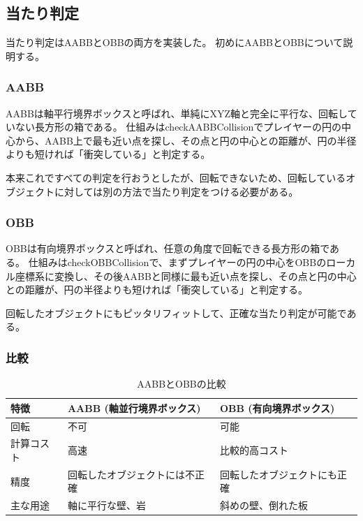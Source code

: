 \documentclass[uplatex,dvipdfmx,a4paper]{jsarticle}
\begin{document}
\subsection{当たり判定}
当たり判定はAABBとOBBの両方を実装した。
初めにAABBとOBBについて説明する。
\subsubsection{AABB}
AABBは軸平行境界ボックスと呼ばれ、単純にXYZ軸と完全に平行な、回転していない長方形の箱である。
仕組みはcheckAABBCollisionでプレイヤーの円の中心から、AABB上で最も近い点を探し、その点と円の中心との距離が、円の半径よりも短ければ「衝突している」と判定する。

本来これですべての判定を行おうとしたが、回転できないため、回転しているオブジェクトに対しては別の方法で当たり判定をつける必要がある。

\subsubsection{OBB}
OBBは有向境界ボックスと呼ばれ、任意の角度で回転できる長方形の箱である。
仕組みはcheckOBBCollisionで、まずプレイヤーの円の中心をOBBのローカル座標系に変換し、その後AABBと同様に最も近い点を探し、その点と円の中心との距離が、円の半径よりも短ければ「衝突している」と判定する。

回転したオブジェクトにもピッタリフィットして、正確な当たり判定が可能である。
\subsubsection{比較}
\begin{table}[H]
    \centering
    \caption{AABBとOBBの比較}
    \label{tab:collision_comparison}
    \begin{tabular}{lp{4.5cm}p{4.5cm}}
        \toprule
        \textbf{特徴} & \textbf{AABB (軸並行境界ボックス)} & \textbf{OBB (有向境界ボックス)} \\
        \midrule
        回転 & 不可 & 可能 \\
        \addlinespace
        計算コスト & 高速 & 比較的高コスト \\
        \addlinespace
        精度 & 回転したオブジェクトには不正確 & 回転したオブジェクトにも正確 \\
        \addlinespace
        主な用途 & 軸に平行な壁、岩 & 斜めの壁、倒れた板 \\
        \bottomrule
    \end{tabular}
\end{table}
\end{document}
